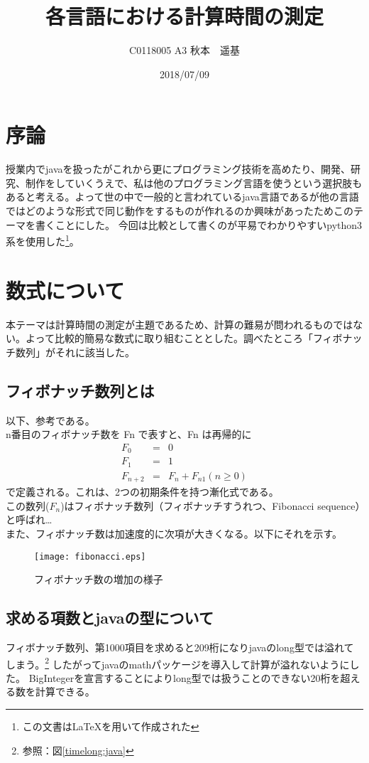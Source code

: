 \documentclass[a4j]{jreport}
\title{各言語における計算時間の測定}
\author{C0118005 A3 秋本　遥基}
\date{2018/07/09}
\begin{document}
\maketitle

\chapter{序論}
授業内でjavaを扱ったがこれから更にプログラミング技術を高めたり、開発、研究、制作をしていくうえで、私は他のプログラミング言語を使うという選択肢もあると考える。よって世の中で一般的と言われているjava言語であるが他の言語ではどのような形式で同じ動作をするものが作れるのか興味があったためこのテーマを書くことにした。
今回は比較として書くのが平易でわかりやすいpython3系を使用した\footnote{この文書は\LaTeX{}を用いて作成された}。
\chapter{数式について}
本テーマは計算時間の測定が主題であるため、計算の難易が問われるものではない。よって比較的簡易な数式に取り組むこととした。調べたところ「フィボナッチ数列」がそれに該当した。
\section{フィボナッチ数列とは}
以下、参考である。\cite{fibwiki}\\

n番目のフィボナッチ数を Fn で表すと、Fn は再帰的に
\begin{eqnarray}
 F_0 &=& 0 \\
 F_1 &=& 1 \\
 F_{n+2} &=& F_n + F_{n1} (n \ge 0)
\end{eqnarray}
で定義される。これは、2つの初期条件を持つ漸化式である。\\
この数列($F_n$)はフィボナッチ数列（フィボナッチすうれつ、Fibonacci sequence）と呼ばれ… \\

また、フィボナッチ数は加速度的に次項が大きくなる。以下にそれを示す。
\begin{figure}[H]
  \centering
  \texttt{[image: fibonacci.eps]}
  \caption{フィボナッチ数の増加の様子}
  \label{figure:fibonacci}
  \end{figure}
\section{求める項数とjavaの型について}
フィボナッチ数列、第1000項目を求めると209桁になりjavaのlong型では溢れてしまう。\footnote{参照：図\ref{timelong:java}}
したがってjavaのmathパッケージ\cite{jmath}を導入して計算が溢れないようにした。
BigIntegerを宣言することによりlong型では扱うことのできない20桁を超える数を計算できる。\cite{mathmath}
\end{document}
